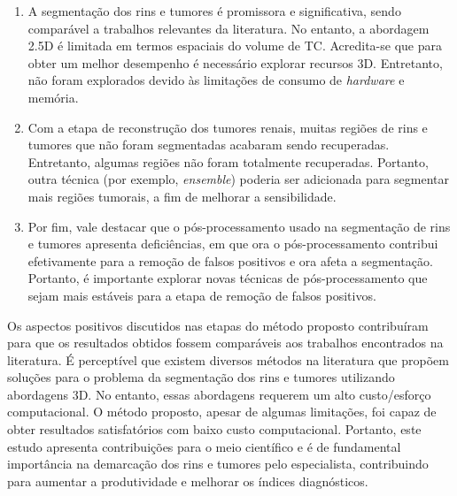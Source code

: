 \begin{enumerate}
    \item A segmentação dos rins e tumores é promissora e significativa, sendo comparável a trabalhos relevantes da literatura. No entanto, a abordagem 2.5D é limitada em termos espaciais do volume de TC. Acredita-se que para obter um melhor desempenho é necessário explorar recursos 3D. Entretanto, não foram explorados devido às limitações de consumo de \textit{hardware} e memória.
    
    \item Com a etapa de reconstrução dos tumores renais, muitas regiões de rins e tumores que não foram segmentadas acabaram sendo recuperadas. Entretanto, algumas regiões não foram totalmente recuperadas. Portanto, outra técnica (por exemplo, \textit{ensemble}) poderia ser adicionada para segmentar mais regiões tumorais, a fim de melhorar a sensibilidade.
    
    \item Por fim, vale destacar que o pós-processamento usado na segmentação de rins e tumores apresenta deficiências, em que ora o pós-processamento contribui efetivamente para a remoção de falsos positivos e ora afeta a segmentação. Portanto, é importante explorar novas técnicas de pós-processamento que sejam mais estáveis para a etapa de remoção de falsos positivos.
\end{enumerate}

Os aspectos positivos discutidos nas etapas do método proposto contribuíram para que os resultados obtidos fossem comparáveis aos trabalhos encontrados na literatura. É perceptível que existem diversos métodos na literatura que propõem soluções para o problema da segmentação dos rins e tumores utilizando abordagens 3D. No entanto, essas abordagens requerem um alto custo/esforço computacional. O método proposto, apesar de algumas limitações, foi capaz de obter resultados satisfatórios com baixo custo computacional. Portanto, este estudo apresenta contribuições para o meio científico e é de fundamental importância na demarcação dos rins e tumores pelo especialista, contribuindo para aumentar a produtividade e melhorar os índices diagnósticos.

